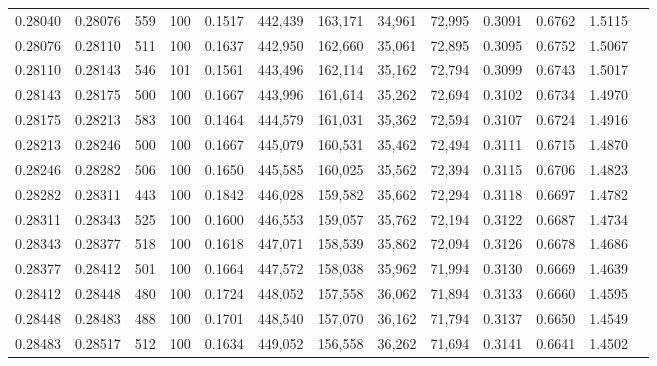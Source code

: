 \begin{tabular}{rrrrrrrrrrrrr}
0.28040 & 0.28076 &   559 & 100 &                                     0.1517 & 442,439 & 163,171 &  34,961 &  72,995 & 0.3091 & 0.6762 & 1.5115 \\
0.28076 & 0.28110 &   511 & 100 &                                     0.1637 & 442,950 & 162,660 &  35,061 &  72,895 & 0.3095 & 0.6752 & 1.5067 \\
0.28110 & 0.28143 &   546 & 101 &                                     0.1561 & 443,496 & 162,114 &  35,162 &  72,794 & 0.3099 & 0.6743 & 1.5017 \\
0.28143 & 0.28175 &   500 & 100 &                                     0.1667 & 443,996 & 161,614 &  35,262 &  72,694 & 0.3102 & 0.6734 & 1.4970 \\
0.28175 & 0.28213 &   583 & 100 &                                     0.1464 & 444,579 & 161,031 &  35,362 &  72,594 & 0.3107 & 0.6724 & 1.4916 \\
0.28213 & 0.28246 &   500 & 100 &                                     0.1667 & 445,079 & 160,531 &  35,462 &  72,494 & 0.3111 & 0.6715 & 1.4870 \\
0.28246 & 0.28282 &   506 & 100 &                                     0.1650 & 445,585 & 160,025 &  35,562 &  72,394 & 0.3115 & 0.6706 & 1.4823 \\
0.28282 & 0.28311 &   443 & 100 &                                     0.1842 & 446,028 & 159,582 &  35,662 &  72,294 & 0.3118 & 0.6697 & 1.4782 \\
0.28311 & 0.28343 &   525 & 100 &                                     0.1600 & 446,553 & 159,057 &  35,762 &  72,194 & 0.3122 & 0.6687 & 1.4734 \\
0.28343 & 0.28377 &   518 & 100 &                                     0.1618 & 447,071 & 158,539 &  35,862 &  72,094 & 0.3126 & 0.6678 & 1.4686 \\
0.28377 & 0.28412 &   501 & 100 &                                     0.1664 & 447,572 & 158,038 &  35,962 &  71,994 & 0.3130 & 0.6669 & 1.4639 \\
0.28412 & 0.28448 &   480 & 100 &                                     0.1724 & 448,052 & 157,558 &  36,062 &  71,894 & 0.3133 & 0.6660 & 1.4595 \\
0.28448 & 0.28483 &   488 & 100 &                                     0.1701 & 448,540 & 157,070 &  36,162 &  71,794 & 0.3137 & 0.6650 & 1.4549 \\
0.28483 & 0.28517 &   512 & 100 &                                     0.1634 & 449,052 & 156,558 &  36,262 &  71,694 & 0.3141 & 0.6641 & 1.4502 \\

\end{tabular}
